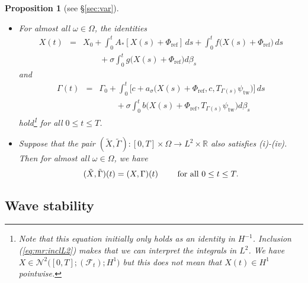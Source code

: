 \documentclass[10pt]{articleHJ}
\newcommand{\Real}{\mathbb{R}}							%
\newcommand{\sref}[1]{(\ref{#1})}                       %
\newtheorem{prop}[thm]{Proposition}
\numberwithin{equation}{section}
\begin{document}
\begin{prop}[{see \S\ref{sec:var}}]
\begin{itemize}
{\begin{equation}
\begin{array}{lcl}
  \end{array}
  \end{equation}
}
\item[(iv)]{
  For almost all $\omega \in \Omega$,
  the identities
  \begin{equation}
  \label{eq:mr:main:ex:itg:eq:x}
  \begin{array}{lcl}
  X(t) & = & X_0 + \int_0^t A_*[ X(s) + \Phi_{\mathrm{ref}} ] \, ds
    + \int_0^t f\big(X(s) + \Phi_{\mathrm{ref}}\big) \, ds
   \\[0.2cm]
   & & \qquad
    + \sigma \int_0^t  g\big(X(s) + \Phi_{\mathrm{ref}}\big) d \beta_s
  \end{array}
  \end{equation}
  and
  \begin{equation}
  \begin{array}{lcl}
   \Gamma(t) & = & \Gamma_0
    + \int_0^t
      \big[ c + a_{\sigma}\big(X(s) + \Phi_{\mathrm{ref}}, c , T_{\Gamma(s)}\psi_{\mathrm{tw}} \big) \big] \, ds
  \\[0.2cm]
  & & \qquad
     + \sigma \int_0^t
        b\big(X(s) + \Phi_{\mathrm{ref}} , T_{\Gamma(s)} \psi_{\mathrm{tw}} \big)
         d \beta_s
  \end{array}
  \end{equation}
  hold\footnote{Note that this equation initially only holds as an identity in $H^{-1}$. Inclusion \sref{eq:mr:inclL2} makes that we can interpret the integrals in $L^2$. We have $X  \in   \mathcal{N}^2 \big( [0 , T] ; (\mathcal{F}_t ) ; H^1 \big)$ but this does not mean that $X(t)\in H^1$ pointwise.} for all $0 \le t \le T$.
}
\item[(v)]{Suppose that the pair $(\tilde{X}, \tilde{\Gamma} ): [0,T] \times \Omega \to L^2 \times \Real$
also satisfies (i)-(iv). Then for almost all $\omega \in \Omega$,
we have
\begin{equation}
(\tilde{X}, \tilde{\Gamma})(t) = (X, \Gamma)(t) \qquad \hbox{ for all } 0 \le t \le T.
\end{equation}
}
\end{itemize}
\end{prop}









\subsection{Wave stability}
\label{sec:mr:wave}
\end{document}
